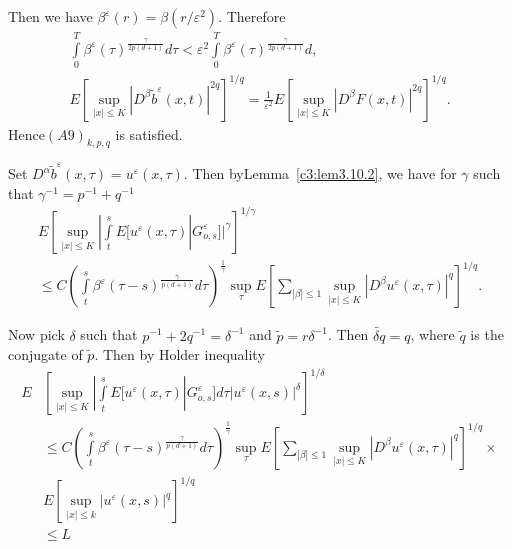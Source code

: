 Then we have $\beta^{\varepsilon}(r) = \beta(r/
\varepsilon^2)$.  Therefore 
\begin{multline*}
  \int\limits^T_0
  \beta^{\varepsilon}(\tau)^{\frac{\gamma}{2p(d+1)}}d \tau <
  \varepsilon^2   \int \limits^T_0
  \beta^{\varepsilon}(\tau)^{\frac{\gamma}{2p(d+1)}}d, \\
  E\left[\sup_{|x|\leq K}|D^{\beta} \tilde{b}^{\varepsilon}(x,t)|^{2q}\right]^{1/q}
  = \frac{1}{\varepsilon^2}E\left[\sup_{|x|\leq K}|D^{\beta}
    F(x,t)|^{2q}\right]^{1/q}. 
\end{multline*}
Hence\pageoriginale $(A9)_{k,p,q}$ is satisfied.

\setcounter{proofoftheorem}{5}
\begin{proofoftheorem}
  Set $D^{\alpha}  \tilde{b}^{\varepsilon}(x,\tau) =
  u^{\varepsilon}(x, \tau)$. Then by\break Lemma~\ref{c3:lem3.10.2}, we have for
  $\gamma$ such that $\gamma^{-1}= p^{-1}+ q^{-1}$ 
  \begin{multline*}
    E\left[\sup_{|x|\leq K} | \int \limits^s_t E[u^{\varepsilon}(x, \tau)
        |G^{\varepsilon}_{o,s}]|^{\gamma}\right]^{1 / \gamma}\\ 
    \leq C\left(\int \limits^s_t
    \beta^{\varepsilon}(\tau-s)^{\frac{\gamma}{p(d+1)}}d
    \tau\right)^{\frac{1}{\gamma}} \sup_{\tau} E \left[ \sum_{|\beta| \leq 1}
      \sup_{|x| \leq K} |D^{\beta}u^{\varepsilon}(x, \tau)|^q\right]^{1/q}. 
  \end{multline*}
\end{proofoftheorem}

Now pick $\delta$ such that $p^{-1} + 2 q^{-1} = \delta^{-1}$ and
$\tilde{p} = r \delta^{-1}$. Then $\tilde{\delta q} =q$, where
$\tilde{q}$ is the conjugate of $\tilde{p}$. Then by Holder inequality 
\begin{align*}
  E& \left[\sup_{|x|\leq K} | \int \limits^s_t E[u^{\varepsilon}(x,
      \tau) |G^{\varepsilon}_{o,s}]d \tau|
    u^{\varepsilon}(x,s)|^{\delta}\right]^{1 / \delta}\\ 
  &\leq C\left(\int \limits^s_t
  \beta^{\varepsilon}(\tau-s)^{\frac{\gamma}{p(d+1)}}d
  \tau\right)^{\frac{1}{\gamma}} \sup_{\tau} E \left[ \sum_{|\beta| \leq 1}
    \sup_{|x| \leq K} |D^{\beta}u^{\varepsilon}(x,
    \tau)|^{q}\right]^{1/q}\times\\
  & E \left[\sup_{|x| \leq k} | u ^\varepsilon (x, s)|^q \right]^{1/q}\\
   & \leq L
\end{align*}

